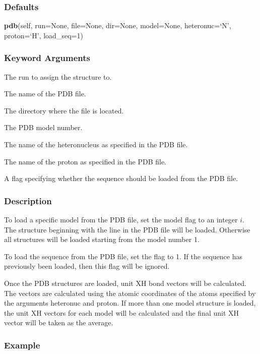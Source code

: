 \subsubsection{Defaults}

\textsf{\textbf{pdb}(self, run=None, file=None, dir=None, model=None, heteronuc=`N', proton=`H', load\_seq=1)}


\subsubsection{Keyword Arguments}


  The run to assign the structure to.

  The name of the PDB file.

  The directory where the file is located.

  The PDB model number.

  The name of the heteronucleus as specified in the PDB file.

  The name of the proton as specified in the PDB file.

  A flag specifying whether the sequence should be loaded from the PDB file.

\subsubsection{Description}

To load a specific model from the PDB file, set the model flag to an integer $i$.  The
structure beginning with the line 
 in the PDB file will be loaded.  Otherwise all
structures will be loaded starting from the model number 1.

To load the sequence from the PDB file, set the 
 flag to 1.  If the sequence has
previously been loaded, then this flag will be ignored.

Once the PDB structures are loaded, unit XH bond vectors will be calculated.  The vectors
are calculated using the atomic coordinates of the atoms specified by the arguments
heteronuc and proton.  If more than one model structure is loaded, the unit XH vectors for
each model will be calculated and the final unit XH vector will be taken as the average.


\subsubsection{Example}

